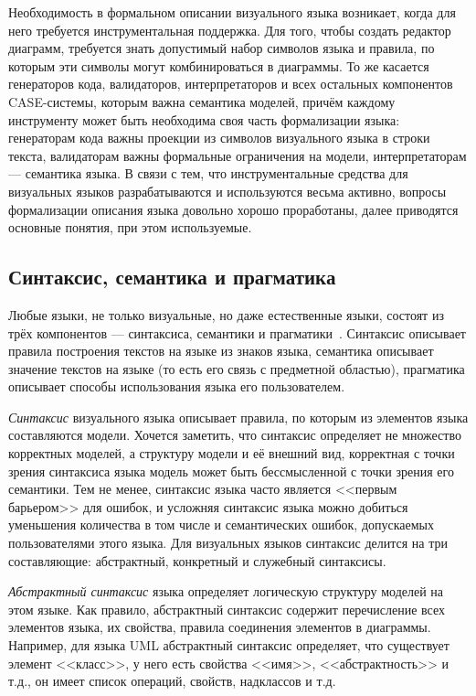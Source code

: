Необходимость в формальном описании визуального языка возникает, когда для него 
требуется инструментальная поддержка. Для того, чтобы создать редактор диаграмм, 
требуется знать допустимый набор символов языка и правила, по которым эти 
символы могут комбинироваться в диаграммы. То же касается генераторов кода, 
валидаторов, интерпретаторов и всех остальных компонентов \ac{CASE}-системы, которым 
важна семантика моделей, причём каждому инструменту может быть необходима своя 
часть формализации языка: генераторам кода важны проекции из символов 
визуального языка в строки текста, валидаторам важны формальные ограничения на 
модели, интерпретаторам --- семантика языка. В связи с тем, что инструментальные 
средства для визуальных языков разрабатываются и используются весьма активно, 
вопросы формализации описания языка довольно хорошо проработаны, далее 
приводятся основные понятия, при этом используемые.

\subsection{Синтаксис, семантика и прагматика}
Любые языки, не только визуальные, но даже естественные языки, состоят из трёх 
компонентов --- синтаксиса, семантики и прагматики~\cite{koznov2008osnovy}. 
Синтаксис описывает правила построения текстов на языке из знаков языка, семантика описывает значение 
текстов на языке (то есть его связь с предметной областью), прагматика описывает 
способы использования языка его пользователем.

\textit{Синтаксис} визуального языка описывает правила, по которым из элементов языка 
составляются модели. Хочется заметить, что синтаксис определяет не множество 
корректных моделей, а структуру модели и её внешний вид, корректная с точки 
зрения синтаксиса языка модель может быть бессмысленной с точки зрения его 
семантики. Тем не менее, синтаксис языка часто является <<первым барьером>> для 
ошибок, и усложняя синтаксис языка можно добиться уменьшения количества в том 
числе и семантических ошибок, допускаемых пользователями этого языка. Для 
визуальных языков синтаксис делится на три составляющие: абстрактный, 
конкретный и служебный синтаксисы.

\textit{Абстрактный синтаксис} языка определяет логическую структуру моделей на этом 
языке. Как правило, абстрактный синтаксис содержит перечисление всех элементов 
языка, их свойства, правила соединения элементов в диаграммы. Например, для 
языка \ac{UML} абстрактный синтаксис определяет, что существует элемент <<класс>>, 
у него есть свойства <<имя>>, <<абстрактность>> и т.д., он имеет список 
операций, свойств, надклассов и т.д.

